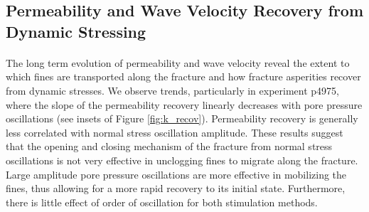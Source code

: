 \documentclass[letterpaper,10pt]{article}
\begin{document}
\subsection{Permeability and Wave Velocity Recovery from Dynamic Stressing}
\paragraph{}
The long term evolution of permeability and wave velocity reveal the extent to which fines are transported along the fracture and how fracture asperities recover from dynamic stresses. We observe trends, particularly in experiment p4975, where the slope of the permeability recovery linearly decreases with pore pressure oscillations (see insets of Figure \ref{fig:k_recov}). Permeability recovery is generally less correlated with normal stress oscillation amplitude. These results suggest that the opening and closing mechanism of the fracture from normal stress oscillations is not very effective in unclogging fines to migrate along the fracture. Large amplitude pore pressure oscillations are more effective in mobilizing the fines, thus allowing for a more rapid recovery to its initial state. Furthermore, there is little effect of order of oscillation for both stimulation methods. 
\end{document}
